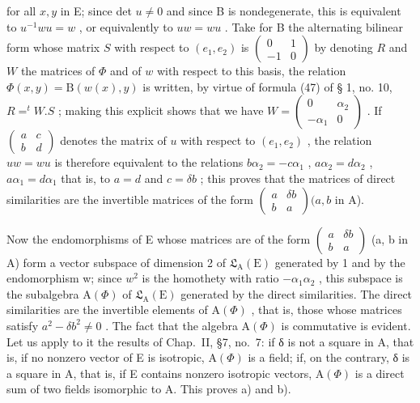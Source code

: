 for all \(x, y\) in E; since det \(u \neq 0\) and since B is nondegenerate, this is equivalent to \(u^{-1}wu = w\) , or equivalently to \(uw = wu\) . Take for B the alternating bilinear form whose matrix \(S\) with respect to \((e_1, e_2)\) is \(\begin{pmatrix} 0 & 1 \\ -1 & 0 \end{pmatrix}\) by denoting \(R\) and \(W\) the matrices of \(\Phi\) and of \(w\) with respect to this basis, the relation \(\Phi(x, y) = \mathrm{B}(w(x), y)\) is written, by virtue of formula (47) of § 1, no. 10, \(R = ^t W.S\) ; making this explicit shows that we have \(W = \begin{pmatrix} 0 & \alpha_2 \\ -\alpha_1 & 0 \end{pmatrix}\) . If \(\begin{pmatrix} a & c \\ b & d \end{pmatrix}\) denotes the matrix of \(u\) with respect to \((e_1, e_2)\) , the relation \(uw = wu\) is therefore equivalent to the relations \(b\alpha_2 = -c\alpha_1\) , \(a\alpha_2 = d\alpha_2\) , \(a\alpha_1 = d\alpha_1\) that is, to \(a = d\) and \(c = \delta b\) ; this proves that the matrices of direct similarities are the invertible matrices of the form \(\begin{pmatrix} a & \delta b \\ b & a \end{pmatrix}(a, b\) in A).

Now the endomorphisms of E whose matrices are of the form \(\begin{pmatrix} a & \delta b \\ b & a \end{pmatrix}\) (a, b in A) form a vector subspace of dimension 2 of \(\mathfrak{L}_{\mathrm{A}}(\mathrm{E})\) generated by 1 and by the endomorphism w; since \(w^{2}\) is the homothety with ratio \(-\alpha_{1}\alpha_{2}\) , this subspace is the subalgebra \(\mathrm{A}(\Phi)\) of \(\mathfrak{L}_{\mathrm{A}}(\mathrm{E})\) generated by the direct similarities. The direct similarities are the invertible elements of \(\mathrm{A}(\Phi)\) , that is, those whose matrices satisfy \(a^{2}-\delta b^{2}\neq0\) . The fact that the algebra \(\mathrm{A}(\Phi)\) is commutative is evident. Let us apply to it the results of Chap.~II, §7, no.~7: if δ is not a square in A, that is, if no nonzero vector of E is isotropic, \(\mathrm{A}(\Phi)\) is a field; if, on the contrary, δ is a square in A, that is, if E contains nonzero isotropic vectors, \(\mathrm{A}(\Phi)\) is a direct sum of two fields isomorphic to A. This proves a) and b).

